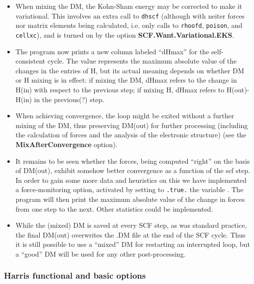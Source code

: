\begin{itemize}
\item When mixing the DM, the Kohn-Sham energy may be corrected to make it
  variational. This involves an extra call to \texttt{dhscf} (although
  with neiter forces nor matrix elements being calculated, i.e. only
  calls to \texttt{rhoofd}, \texttt{poison}, and \texttt{cellxc}), and is
  turned on by the option \textbf{SCF.Want.Variational.EKS}.


\item The program now prints a new column labeled ``dHmax'' for the
  self-consistent cycle. The value represents the maximum absolute
  value of the changes in the entries of H, but its actual meaning
  depends on whether DM or H mixing is in effect: if mixing the DM,
  dHmax refers to the change in H(in) with respect to the previous
  step; if mixing H, dHmax refers to H(out)-H(in) in the previous(?)
  step.

\item When achieving convergence, the loop might be exited without a further
  mixing of the DM, thus preserving DM(out) for further processing
  (including the calculation of forces and the analysis of the
  electronic structure) (see the \textbf{MixAfterConvergence} option).


\item It remains to be seen whether the forces, being computed
  ``right'' on the basis of DM(out), exhibit somehow better convergence
  as a function of the scf step. In order to gain some more data and
  heuristics on this we have implemented a force-monitoring option,
  activated by setting to \texttt{.true.} the variable . The program will then print the maximum
  absolute value of the change in forces from one step to the
  next. Other statistics could be implemented.

\item While the (mixed) DM is saved at every SCF step, as was standard
  practice, the final DM(out) overwrites the .DM file at the end of
  the SCF cycle. Thus it is still possible to use a ``mixed'' DM for
  restarting an interrupted loop, but a ``good'' DM will be used for
  any other post-processing.

\end{itemize}


\subsubsection{Harris functional and basic options}

